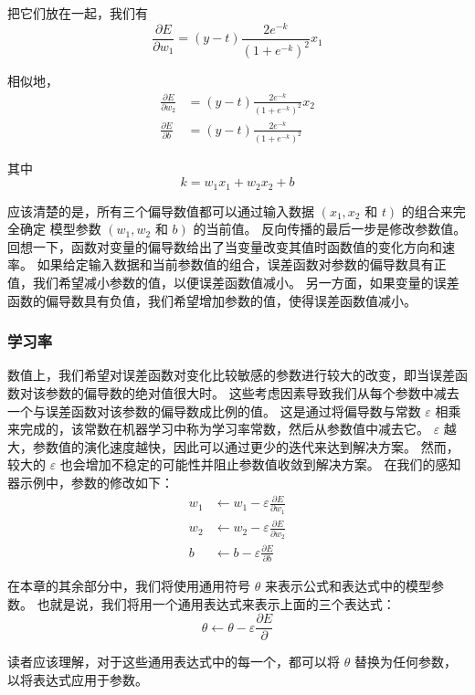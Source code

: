 把它们放在一起，我们有
$$
\frac{\partial E}{\partial w_{1}}=(y-t) \frac{2 e^{-k}}{\left(1+e^{-k}\right)^{2}} x_{1}
$$

相似地，
$$
\begin{aligned}
\frac{\partial E}{\partial w_{2}} & =(y-t) \frac{2 e^{-k}}{\left(1+e^{-k}\right)^{2} } x_{2} \\
\frac{\partial E}{\partial b} & =(y-t) \frac{2 e^{-k}}{\left(1+e^{-k}\right)^{2}}
\end{aligned}
$$

其中
$$
k=w_{1} x_{1}+w_{2} x_{2}+b
$$

应该清楚的是，所有三个偏导数值都可以通过输入数据 $\left(x_{1}, x_{2}\right.$ 
和 $\left.t\right)$ 的组合来完全确定 模型参数 $\left(w_{1}, w_{2}\right.$ 和 $\left.b\right)$ 的当前值。 
反向传播的最后一步是修改参数值。 回想一下，函数对变量的偏导数给出了当变量改变其值时函数值的变化方向和速率。 
如果给定输入数据和当前参数值的组合，误差函数对参数的偏导数具有正值，我们希望减小参数的值，以便误差函数值减小。 
另一方面，如果变量的误差函数的偏导数具有负值，我们希望增加参数的值，使得误差函数值减小。

\subsubsection{学习率}
数值上，我们希望对误差函数对变化比较敏感的参数进行较大的改变，即当误差函数对该参数的偏导数的绝对值很大时。 
这些考虑因素导致我们从每个参数中减去一个与误差函数对该参数的偏导数成比例的值。 
这是通过将偏导数与常数 $\varepsilon$ 相乘来完成的，该常数在机器学习中称为学习率常数，然后从参数值中减去它。 
$\varepsilon$ 越大，参数值的演化速度越快，因此可以通过更少的迭代来达到解决方案。 
然而，较大的 $\varepsilon$ 也会增加不稳定的可能性并阻止参数值收敛到解决方案。 在我们的感知器示例中，参数的修改如下：
$$
\begin{aligned}
w_{1} & \leftarrow w_{1}-\varepsilon \frac{\partial E}{\partial w_{1}} \\
w_{2} & \leftarrow w_{2}-\varepsilon \frac{\partial E}{\partial w_{2}} \\
b & \leftarrow b-\varepsilon \frac{\partial E}{\partial b}
\end{aligned}
$$

在本章的其余部分中，我们将使用通用符号 $\theta$ 来表示公式和表达式中的模型参数。 
也就是说，我们将用一个通用表达式来表示上面的三个表达式：
$$
\theta \leftarrow \theta-\varepsilon \frac{\partial E}{\partial}
$$

读者应该理解，对于这些通用表达式中的每一个，都可以将 $\theta$ 替换为任何参数，以将表达式应用于参数。

